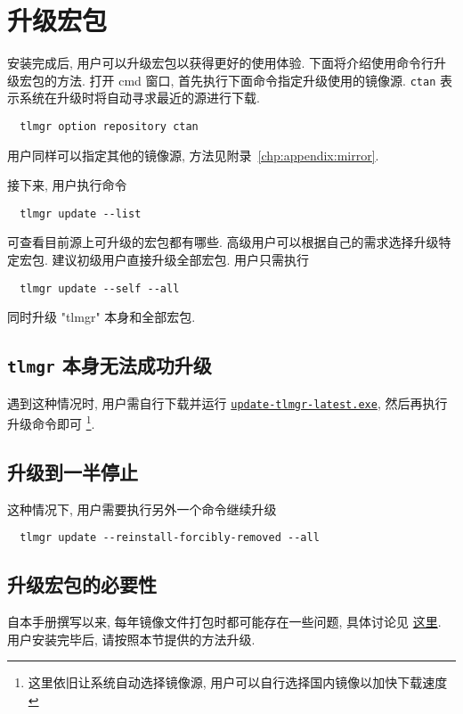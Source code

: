 \section{升级宏包}\label{sec:windows:update}

安装完成后, 用户可以升级宏包以获得更好的使用体验.
下面将介绍使用命令行升级宏包的方法.
打开 \textsf{cmd} 窗口, 首先执行下面命令指定升级使用的镜像源.
\texttt{ctan} 表示系统在升级时将自动寻求最近的源进行下载.
\begin{lstlisting}
  tlmgr option repository ctan
\end{lstlisting}
用户同样可以指定其他的镜像源,
方法见附录~\ref{chp:appendix:mirror}.

接下来, 用户执行命令
\begin{lstlisting}
  tlmgr update --list
\end{lstlisting}
可查看目前源上可升级的宏包都有哪些.
高级用户可以根据自己的需求选择升级特定宏包.
建议初级用户直接升级全部宏包.
用户只需执行
\begin{lstlisting}
  tlmgr update --self --all
\end{lstlisting}
同时升级 "tlmgr" 本身和全部宏包.

\subsection{\texttt{tlmgr} 本身无法成功升级}

遇到这种情况时, 用户需自行下载并运行
\href{https://mirrors.ctan.org/systems/texlive/tlnet/update-tlmgr-latest.exe}{\texttt{update-tlmgr-latest.exe}},
然后再执行升级命令即可%
\footnote{这里依旧让系统自动选择镜像源,
用户可以自行选择国内镜像以加快下载速度}.

\subsection{升级到一半停止}

这种情况下, 用户需要执行另外一个命令继续升级
\begin{lstlisting}
  tlmgr update --reinstall-forcibly-removed --all
\end{lstlisting}

\subsection{升级宏包的必要性}

自本手册撰写以来,
每年镜像文件打包时都可能存在一些问题,
具体讨论见%
\href{https://github.com/CTeX-org/ctex-kit/issues/569}{这里}.
用户安装完毕后,
请按照本节提供的方法升级.

